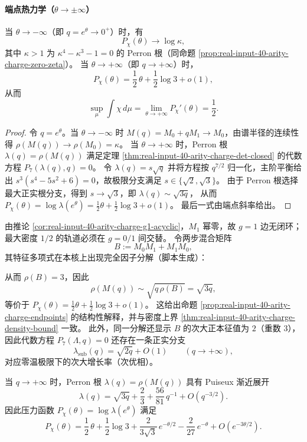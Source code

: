 \paragraph{端点热力学（$\theta\to\pm\infty$）}
\begin{proposition}[端点压力与极端电荷密度]\label{prop:real-input-40-arity-charge-endpoints}
当 $\theta\to-\infty$（即 $q=e^\theta\to 0^+$）时，有
\[
P_\chi(\theta)\to \log\kappa,
\]
其中 $\kappa>1$ 为 $\kappa^4-\kappa^3-1=0$ 的 Perron 根（同命题 \ref{prop:real-input-40-arity-charge-zero-zeta}）。
当 $\theta\to+\infty$（即 $q\to+\infty$）时，
\[
P_\chi(\theta)=\frac12\,\theta+\frac12\log 3+o(1),
\]
从而
\[
\sup_\mu\int\chi\,d\mu=\lim_{\theta\to+\infty}P_\chi'(\theta)=\frac12.
\]
\end{proposition}

\begin{proof}
令 $q=e^\theta$。当 $\theta\to-\infty$ 时 $M(q)=M_0+qM_1\to M_0$，由谱半径的连续性得
$\rho(M(q))\to\rho(M_0)=\kappa$。
当 $\theta\to+\infty$ 时，Perron 根 $\lambda(q)=\rho(M(q))$ 满足定理 \ref{thm:real-input-40-arity-charge-det-closed} 的代数方程
$P_7(\lambda(q),q)=0$。
令 $\lambda(q)=s\sqrt q$ 并将方程按 $q^{7/2}$ 归一化，主阶平衡给出
$s^3(s^4-5s^2+6)=0$，故极限分支满足 $s\in\{\sqrt2,\sqrt3\}$。
由于 Perron 根选择最大正实根分支，得到 $s\to\sqrt3$，即 $\lambda(q)\sim \sqrt{3q}$，
从而 $P_\chi(\theta)=\log\lambda(e^\theta)=\frac12\theta+\frac12\log 3+o(1)$。
最后一式由端点斜率给出。
\end{proof}

\begin{remark}[大偏置极限的组合机制]\label{rem:real-input-40-arity-charge-large-bias-mechanism}
由推论 \ref{cor:real-input-40-arity-charge-g1-acyclic}，$M_1$ 幂零，故 $g=1$ 边无闭环；
最大密度 $1/2$ 的轨道必须在 $g=0/1$ 间交替。
令两步混合矩阵
\[
B:=M_0M_1+M_1M_0,
\]
其特征多项式在本核上出现完全因子分解（脚本生成）：

从而 $\rho(B)=3$，因此
\[
\rho(M(q))\sim\sqrt{q\,\rho(B)}=\sqrt{3q},
\]
等价于 $P_\chi(\theta)=\frac12\theta+\frac12\log 3+o(1)$。
这给出命题 \ref{prop:real-input-40-arity-charge-endpoints} 的结构性解释，并与密度上界 \ref{thm:real-input-40-arity-charge-density-bound} 一致。
此外，同一分解还显示 \(B\) 的次大正本征值为 \(2\)（重数 \(3\)），因此代数方程 \(P_7(\Lambda,q)=0\) 还存在一条正实分支
\[
\lambda_{\mathrm{sub}}(q)=\sqrt{2q}+O(1)\qquad(q\to+\infty),
\]
对应零温极限下的次大增长率（次优相）。
\end{remark}

\begin{proposition}\label{prop:real-input-40-arity-charge-zero-temp-expansion}
当 $q\to+\infty$ 时，Perron 根 $\lambda(q)=\rho(M(q))$ 具有 Puiseux 渐近展开
\[
\lambda(q)=\sqrt{3q}+\frac23+\frac{56}{81}\,q^{-1}+O(q^{-3/2}).
\]
因此压力函数 $P_\chi(\theta)=\log\lambda(e^\theta)$ 满足
\[
P_\chi(\theta)=\frac12\,\theta+\frac12\log 3+\frac{2}{3\sqrt3}\,e^{-\theta/2}-\frac{2}{27}\,e^{-\theta}+O(e^{-3\theta/2}).
\]
\end{proposition}

